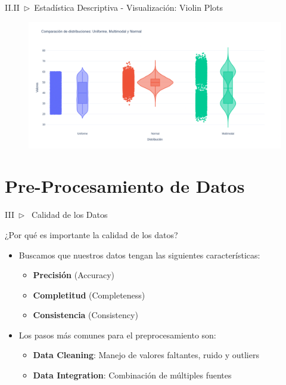 \documentclass[xcolor=dvipsnames]{beamer}
\begin{document}
    \begin{frame}{II.II~$\rhd$~Estadística Descriptiva - Visualización: Violin Plots}
        \begin{figure}
        \centering
        \includegraphics[width=\textwidth]{imgs/violin/ej2_04.png}
        \end{figure}
    \end{frame}

    \section{Pre-Procesamiento de Datos}
    \begin{frame}{III~$\rhd$~ Calidad de los Datos} 
        \begin{block}{¿Por qué es importante la calidad de los datos?}
            \begin{itemize}
                \item Buscamos que nuestros datos tengan las siguientes características:
                \begin{itemize}
                    \item \textbf{Precisión} (Accuracy)
                    \item \textbf{Completitud} (Completeness)
                    \item \textbf{Consistencia} (Consistency)
                \end{itemize}
                \vspace{5mm}%
                \item Los pasos más comunes para el preprocesamiento son:
                \begin{itemize}
                    \item \textbf{Data Cleaning}: Manejo de valores faltantes, ruido y outliers
                    \item \textbf{Data Integration}: Combinación de múltiples fuentes
                \end{itemize}
            \end{itemize}
        \end{block}
    \end{frame}
\end{document}
